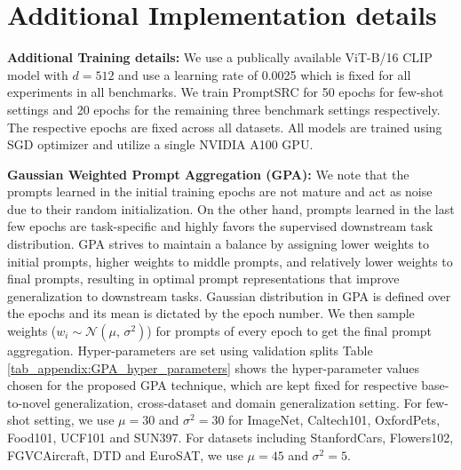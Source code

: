 \documentclass[10pt,twocolumn,letterpaper]{article}
\begin{document}
\section{Additional Implementation details}
\label{appendix:additional_implementation_details}
\noindent \textbf{{Additional Training details:}} We use a publically available ViT-B/16 CLIP model with $d=512$ and use a learning rate of 0.0025 which is fixed for all experiments in all benchmarks. We train PromptSRC for 50 epochs for few-shot settings and 20 epochs for the remaining three benchmark settings respectively. The respective epochs are fixed across all datasets. All models are trained using SGD optimizer and utilize a single NVIDIA A100 GPU. 

\noindent \textbf{Gaussian Weighted Prompt Aggregation (GPA):}
We note that the prompts learned in the initial training epochs are not mature and act as noise due to their random initialization. 
On the other hand, prompts learned in the last few epochs are task-specific and highly favors the supervised downstream task distribution. GPA strives to maintain a balance by assigning lower weights to initial prompts, higher weights to middle prompts, and relatively lower weights to final prompts, resulting in optimal prompt representations that improve generalization to downstream tasks. Gaussian distribution in GPA is defined over the epochs and its mean is dictated by the epoch number. We then sample weights ($w_{i} \sim \mathcal{N}(\mu,\,\sigma^{2})$) for prompts of every epoch to get the final prompt aggregation. Hyper-parameters are set using validation splits
Table \ref{tab_appendix:GPA_hyper_parameters} shows the hyper-parameter values chosen for the proposed GPA technique, which are kept fixed for respective base-to-novel generalization, cross-dataset and domain generalization setting. For few-shot setting, we use $\mu=30$ and $\sigma^2=30$ for ImageNet, Caltech101, OxfordPets, Food101, UCF101 and  SUN397. For datasets including StanfordCars, Flowers102, FGVCAircraft, DTD and EuroSAT, we use $\mu=45$ and $\sigma^2=5$.
\end{document}
